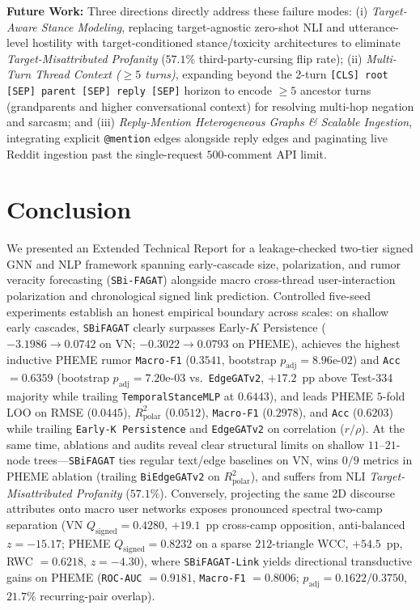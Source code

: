 \documentclass[conference]{IEEEtran}
\begin{document}
\textbf{Future Work:} Three directions directly address these failure modes: (i) \emph{Target-Aware Stance Modeling}, replacing target-agnostic zero-shot NLI and utterance-level hostility with target-conditioned stance/toxicity architectures to eliminate \emph{Target-Misattributed Profanity} ($57.1\%$ third-party-cursing flip rate); (ii) \emph{Multi-Turn Thread Context ($\ge 5$ turns)}, expanding beyond the 2-turn \texttt{[CLS] root [SEP] parent [SEP] reply [SEP]} horizon to encode $\ge 5$ ancestor turns (grandparents and higher conversational context) for resolving multi-hop negation and sarcasm; and (iii) \emph{Reply-Mention Heterogeneous Graphs \& Scalable Ingestion}, integrating explicit \texttt{@mention} edges alongside reply edges and paginating live Reddit ingestion past the single-request $500$-comment API limit.

\section{Conclusion}
We presented an Extended Technical Report for a leakage-checked two-tier signed GNN and NLP framework spanning early-cascade size, polarization, and rumor veracity forecasting (\texttt{SBi-FAGAT}) alongside macro cross-thread user-interaction polarization and chronological signed link prediction. Controlled five-seed experiments establish an honest empirical boundary across scales: on shallow early cascades, \texttt{SBiFAGAT} clearly surpasses Early-$K$ Persistence ($-3.1986 \to 0.0742$ on VN; $-0.3022 \to 0.0793$ on PHEME), achieves the highest inductive PHEME rumor \texttt{Macro-F1} ($0.3541$, bootstrap $p_{\text{adj}} = 8.96\text{e-}02$) and \texttt{Acc} $= 0.6359$ (bootstrap $p_{\text{adj}} = 7.20\text{e-}03$ vs.\ \texttt{EdgeGATv2}, $+17.2$~pp above Test-334 majority while trailing \texttt{TemporalStanceMLP} at $0.6443$), and leads PHEME $5$-fold LOO on RMSE ($0.0445$), $R^2_{\text{polar}}$ ($0.0512$), \texttt{Macro-F1} ($0.2978$), and \texttt{Acc} ($0.6203$) while trailing \texttt{Early-K Persistence} and \texttt{EdgeGATv2} on correlation ($r/\rho$). At the same time, ablations and audits reveal clear structural limits on shallow $11$--$21$-node trees---\texttt{SBiFAGAT} ties regular text/edge baselines on VN, wins $0/9$ metrics in PHEME ablation (trailing \texttt{BiEdgeGATv2} on $R^2_{\text{polar}}$), and suffers from NLI \emph{Target-Misattributed Profanity} ($57.1\%$). Conversely, projecting the same 2D discourse attributes onto macro user networks exposes pronounced spectral two-camp separation (VN $Q_{\text{signed}} = 0.4280$, $+19.1$~pp cross-camp opposition, anti-balanced $z = -15.17$; PHEME $Q_{\text{signed}} = 0.8232$ on a sparse $212$-triangle WCC, $+54.5$~pp, RWC $= 0.6218$, $z = -4.30$), where \texttt{SBiFAGAT-Link} yields directional transductive gains on PHEME (\texttt{ROC-AUC} $= 0.9181$, \texttt{Macro-F1} $= 0.8006$; $p_{\text{adj}} = 0.1622 / 0.3750$, $21.7\%$ recurring-pair overlap).
\end{document}

